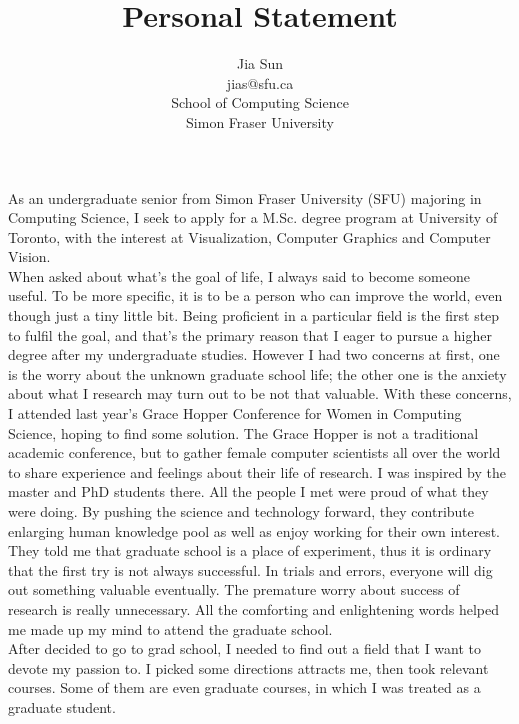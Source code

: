 \documentclass{article}
\title{Personal Statement}
\author{Jia Sun\\jias@sfu.ca\\School of Computing Science\\Simon Fraser University}
\begin{document}
\maketitle%

As an undergraduate senior from Simon Fraser University (SFU) majoring in Computing Science, I seek to apply for a M.Sc. degree program at University of Toronto, with the interest at Visualization, Computer Graphics and Computer Vision. \\


When asked about what's the goal of life, I always said to become someone useful. To be more specific, it is to be a person who can improve the world, even though just a tiny little bit. Being proficient in a particular field is the first step to fulfil the goal, and that's the primary reason that I eager to pursue a higher degree after my undergraduate studies. However I had two concerns at first, one is the worry about the unknown graduate school life; the other one is the anxiety about what I research may turn out to be not that valuable. With these concerns, I attended last year's Grace Hopper Conference for Women in Computing Science, hoping to find some solution. The Grace Hopper is not a traditional academic conference, but to gather female computer scientists all over the world to share experience and feelings about their life of research. I was inspired by the master and PhD students there. All the people I met were proud of what they were doing. By pushing the science and technology forward, they contribute enlarging human knowledge pool as well as enjoy working for their own interest. They told me that graduate school is a place of experiment, thus it is ordinary that the first try is not always successful. In trials and errors, everyone will dig out something valuable eventually. The premature worry about success of research is really unnecessary. All the comforting and enlightening words helped me made up my mind to attend the graduate school.  \\


After decided to go to grad school, I needed to find out a field that I want to devote my passion to. I picked some directions attracts me, then took relevant courses. Some of them are even graduate courses, in which I was treated as a graduate student.\\
\end{document}

